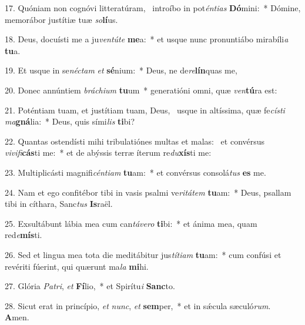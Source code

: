 17. Quóniam non cognóvi litteratúram, \dag\  introíbo in pot\textit{én}\textit{ti}\textit{as} \textbf{Dó}mini:~*  Dómine, memorábor justítiæ tuæ \textit{so}\textbf{lí}us.\

18. Deus, docuísti me a ju\textit{ven}\textit{tú}\textit{te} \textbf{me}a:~*  et usque nunc pronuntiábo mirabíli\textit{a} \textbf{tu}a.\

19. Et usque in se\textit{néc}\textit{tam} \textit{et} \textbf{sé}nium:~*  Deus, ne de\textit{re}\textbf{lín}quas me,\

20. Donec annúntiem \textit{brá}\textit{chi}\textit{um} \textbf{tu}um~*  generatióni omni, quæ \textit{ven}\textbf{tú}ra est:\

21. Poténtiam tuam, et justítiam tuam, Deus, \dag\  usque in altíssima, quæ fe\textit{cís}\textit{ti} \textit{ma}\textbf{gná}lia:~*  Deus, quis sími\textit{lis} \textbf{ti}bi?\

22. Quantas ostendísti mihi tribulatiónes multas et malas: \dag\  et convérsus \textit{vi}\textit{vi}\textit{fi}\textbf{cás}ti me:~*  et de abýssis terræ íterum re\textit{du}\textbf{xís}ti me:\

23. Multiplicásti magnifi\textit{cén}\textit{ti}\textit{am} \textbf{tu}am:~*  et convérsus consolá\textit{tus} \textbf{es} me.\

24. Nam et ego confitébor tibi in vasis psalmi ve\textit{ri}\textit{tá}\textit{tem} \textbf{tu}am:~*  Deus, psallam tibi in cíthara, Sanc\textit{tus} \textbf{Is}raël.\

25. Exsultábunt lábia mea cum can\textit{tá}\textit{ve}\textit{ro} \textbf{ti}bi:~*  et ánima mea, quam red\textit{e}\textbf{mís}ti.\

26. Sed et lingua mea tota die meditábitur jus\textit{tí}\textit{ti}\textit{am} \textbf{tu}am:~*  cum confúsi et revériti fúerint, qui quærunt ma\textit{la} \textbf{mi}hi.\

27. Glória \textit{Pa}\textit{tri}, \textit{et} \textbf{Fí}lio,~*  et Spirítu\textit{i} \textbf{Sanc}to.\

28. Sicut erat in princípio, \textit{et} \textit{nunc}, \textit{et} \textbf{sem}per,~*  et in sǽcula sæculó\textit{rum}. \textbf{A}men.\

